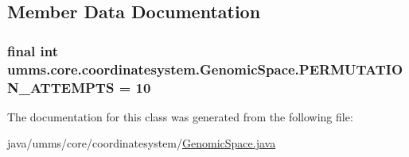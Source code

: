 \subsection{Member Data Documentation}
\hypertarget{classumms_1_1core_1_1coordinatesystem_1_1_genomic_space_a7fe9cbd77f774318fab0ad2ad65fa4ae}{
\subsubsection[{P\+E\+R\+M\+U\+T\+A\+T\+I\+O\+N\+\_\+\+A\+T\+T\+E\+M\+P\+T\+S}]{\setlength{\rightskip}{0pt plus 5cm}final int umms.\+core.\+coordinatesystem.\+Genomic\+Space.\+P\+E\+R\+M\+U\+T\+A\+T\+I\+O\+N\+\_\+\+A\+T\+T\+E\+M\+P\+T\+S = 10\hspace{0.3cm}{\ttfamily [static]}}}\label{classumms_1_1core_1_1coordinatesystem_1_1_genomic_space_a7fe9cbd77f774318fab0ad2ad65fa4ae}


The documentation for this class was generated from the following file\+:\begin{DoxyCompactItemize}
\item 
java/umms/core/coordinatesystem/\hyperlink{_genomic_space_8java}{Genomic\+Space.\+java}\end{DoxyCompactItemize}
